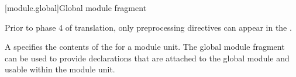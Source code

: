 [module.global]{Global module fragment}

\begin{bnf}
\br
     \terminal{;} 
\end{bnf}

\pnum
\begin{note}
Prior to phase 4 of translation,
only preprocessing directives can appear
in the .
\end{note}

\pnum
A  specifies the contents of the
 for a module unit.
The global module fragment can be used to provide declarations
that are attached to the global module and usable within the module unit.

